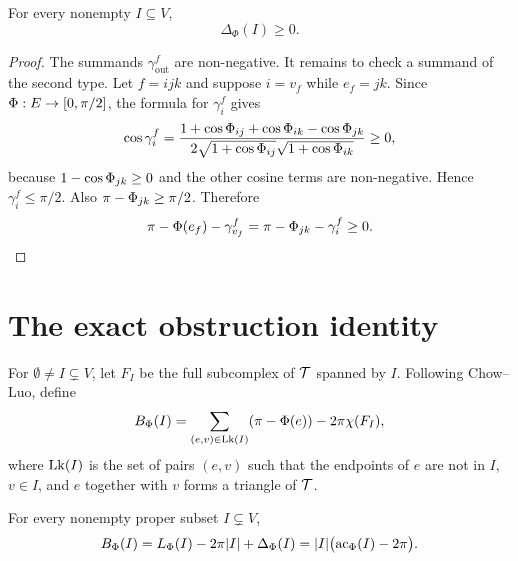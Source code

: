 \begin{lemma}\label{lem:nonneg-correction}
\leanok
For every nonempty $I\subseteq V$,
\[
  \Delta_\Phi(I)\ge 0.
\]
\end{lemma}

\begin{proof}
The summands $\gamma_{\mathrm{out}}^f$ are non-negative.  It remains to
check a summand of the second type.  Let $f=ijk$ and suppose $i=v_f$ while
$e_f=jk$.  Since $\Phi:E\to[0,\pi/2]$, the formula for $\gamma_i^f$ gives
\[
 \cos \gamma_i^f
 =
 \frac{1+\cos\Phi_{ij}+\cos\Phi_{ik}-\cos\Phi_{jk}}
      {2\sqrt{1+\cos\Phi_{ij}}\sqrt{1+\cos\Phi_{ik}}}
 \ge 0,
\]
because $1-\cos\Phi_{jk}\ge0$ and the other cosine terms are
non-negative.  Hence $\gamma_i^f\le\pi/2$.  Also
$\pi-\Phi_{jk}\ge\pi/2$.  Therefore
\[
  \pi-\Phi(e_f)-\gamma_{v_f}^f
  =
  \pi-\Phi_{jk}-\gamma_i^f
  \ge 0.
\]
\end{proof}

\section{The exact obstruction identity}

For $\emptyset\ne I\subsetneq V$, let $F_I$ be the full subcomplex of
$\mathcal T$ spanned by $I$.  Following Chow--Luo, define
\[
  B_\Phi(I)
  =
  \sum_{(e,v)\in\operatorname{Lk}(I)}(\pi-\Phi(e))-2\pi\chi(F_I),
\]
where $\operatorname{Lk}(I)$ is the set of pairs $(e,v)$ such that the endpoints of $e$
are not in $I$, $v\in I$, and $e$ together with $v$ forms a triangle of
$\mathcal T$.

\begin{lemma}\label{lem:obstruction-corrected-surplus}
\leanok
For every nonempty proper subset $I\subsetneq V$,
\[
  B_\Phi(I)=L_\Phi(I)-2\pi |I|+\Delta_\Phi(I)
  =
  |I|\bigl(\operatorname{ac}_\Phi(I)-2\pi\bigr).
\]
\end{lemma}

